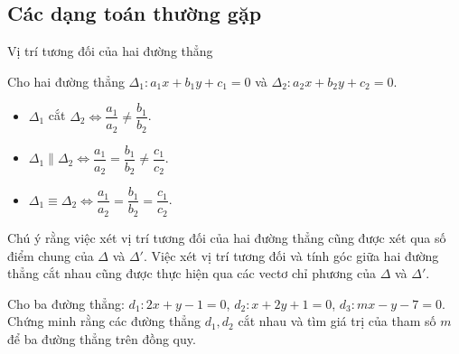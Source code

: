 \subsection{Các dạng toán thường gặp}
\begin{dang}{Vị trí tương đối của hai đường thẳng}
	\begin{center}
		Cho hai đường thẳng $\Delta_1\colon a_1x+b_1y+c_1=0$ và $ \Delta_2\colon a_2x+b_2y+c_2=0$.
	\end{center}
	\begin{itemize}
		\item $ \Delta_1$ cắt $ \Delta_2 \Leftrightarrow \dfrac{a_1}{a_2}\ne \dfrac{b_1}{b_2}$.
		\item $ \Delta_1\parallel \Delta_2 \Leftrightarrow \dfrac{a_1}{a_2}=\dfrac{b_1}{b_2}\ne \dfrac{c_1}{c_2}$.
		\item $ \Delta_1\equiv \Delta_2 \Leftrightarrow \dfrac{a_1}{a_2}=\dfrac{b_1}{b_2}=\dfrac{c_1}{c_2}$.
	\end{itemize}
	Chú ý rằng việc xét vị trí tương đối của hai đường thẳng cũng được xét qua số điểm chung của $\Delta$ và $\Delta'$. Việc xét vị trí tương đối và tính góc giữa hai đường thẳng cắt nhau cũng được thực hiện qua các vectơ chỉ phương của $\Delta$ và $\Delta'$.
\end{dang}
\begin{vd}%
	Cho ba đường thẳng: $d_1: 2x+y-1=0$, $d_2: x+2y+1=0$, $d_3: mx-y-7=0$. Chứng minh rằng các đường thẳng $d_1, d_2$ cắt nhau và tìm giá trị của tham số $m$ để ba đường thẳng trên đồng quy.
\end{vd}

